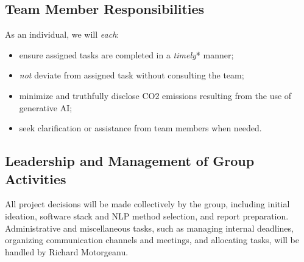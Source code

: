 \documentclass[11pt, letterpaper, notitlepage]{article}
\begin{document}
\subsection{Team Member Responsibilities}


As an individual, we will \textit{each}:
\begin{itemize}[noitemsep, nolistsep]
    \item ensure assigned tasks are completed in a \textit{timely}* manner;
    \item \textit{not} deviate from assigned task without consulting the team;
    \item minimize and truthfully disclose CO2 emissions resulting from the use of generative AI;
    \item seek clarification or assistance from team members when needed.
\end{itemize}

\subsection{Leadership and Management of Group Activities}



All project decisions will be made collectively by the group, including initial ideation, software stack and NLP method selection, and report preparation. Administrative and miscellaneous tasks, such as managing internal deadlines, organizing communication channels and meetings, and allocating tasks, will be handled by Richard Motorgeanu.
\end{document}
